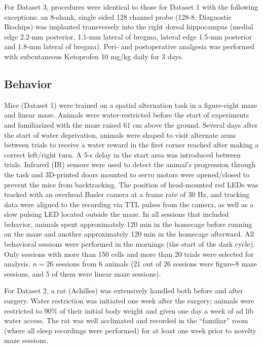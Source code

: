 For Dataset 3, procedures were identical to those for Dataset 1 with the following exceptions: an 8-shank, single sided 128 channel probe (128-8, Diagnostic Biochips) was implanted transversely into the right dorsal hippocampus (medial edge 2.2-mm posterior, 1.1-mm lateral of bregma, lateral edge 1.5-mm posterior and 1.8-mm lateral of bregma). Peri- and postoperative analgesia was performed with subcutaneous Ketoprofen 10 mg/kg daily for 3 days.

\subsection{Behavior}

Mice (Dataset 1) were trained on a spatial alternation task in a figure-eight maze and linear maze. Animals were water-restricted before the start of experiments and familiarized with the maze raised 61 cm above the ground. Several days after the start of water deprivation, animals were shaped to visit alternate arms between trials to receive a water reward in the first corner reached after making a correct left/right turn. A 5-s delay in the start area was introduced between trials. Infrared (IR) sensors were used to detect the animal's progression through the task and 3D-printed doors mounted to servo motors were opened/closed to prevent the mice from backtracking. The position of head-mounted red LEDs was tracked with an overhead Basler camera at a frame rate of 30 Hz, and tracking data were aligned to the recording via TTL pulses from the camera, as well as a slow pulsing LED located outside the maze. In all sessions that included behavior, animals spent approximately 120 min in the homecage before running on the maze and another approximately 120 min in the homecage afterward. All behavioral sessions were performed in the mornings (the start of the dark cycle). Only sessions with more than 150 cells and more than 20 trials were selected for analysis. $n = 26$ sessions from 6 animals (21 out of 26 sessions were figure-8 maze sessions, and 5 of them were linear maze sessions).

For Dataset 2, a rat (Achilles) was extensively handled both before and after surgery. Water restriction was initiated one week after the surgery; animals were restricted to 90\% of their initial body weight and given one day a week of ad lib water access. The rat was well acclimated and recorded in the ``familiar'' room (where all sleep recordings were performed) for at least one week prior to novelty maze sessions.

